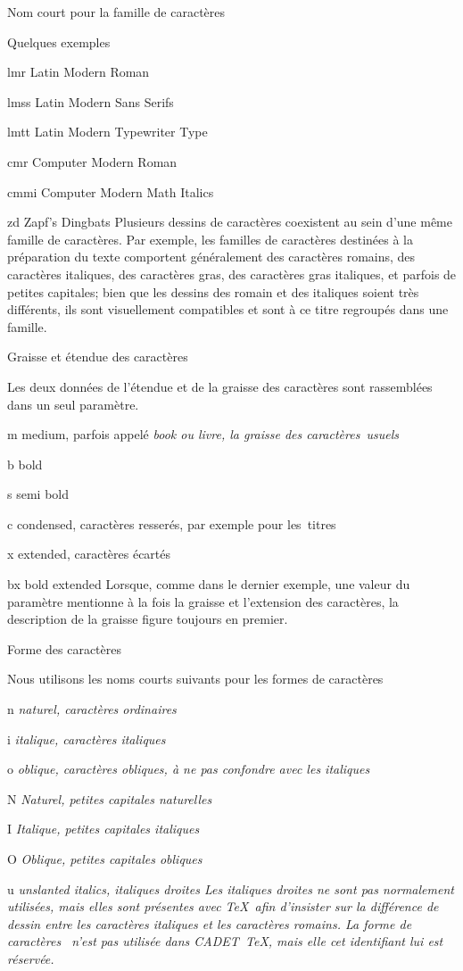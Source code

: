\formalpar Nom court pour la famille de caractères

Quelques exemples
\beginlist\tag
\item{lmr}	Latin Modern Roman
\item{lmss}	Latin Modern Sans Serifs
\item{lmtt}	Latin Modern Typewriter Type
\item{cmr}	Computer Modern Roman
\item{cmmi}	Computer Modern Math Italics
\item{zd}	Zapf's Dingbats
\endlist
Plusieurs dessins de caractères coexistent au sein d'une même famille
de caractères. Par exemple, les familles de caractères destinées à la
préparation du texte comportent généralement des caractères romains,
des caractères italiques, des caractères gras, des caractères gras
italiques, et parfois de petites capitales; bien que les dessins des
romain et des italiques soient très différents, ils sont visuellement
compatibles et sont à ce titre regroupés dans une famille.

\formalpar Graisse et étendue des caractères

Les deux données de l'étendue et de la graisse des caractères sont
rassemblées dans un seul paramètre.
\beginlist\tag
\item{m}	medium, parfois appelé \em{book} ou livre, la graisse
		des caractères~usuels
\item{b}	bold
\item{s}	semi bold
\smallskip
\item{c}	condensed, caractères resserés, par exemple pour les~titres
\item{x}	extended, caractères écartés
\smallskip
\item{bx}	bold extended
\endlist
Lorsque, comme dans le dernier exemple, une valeur du paramètre
mentionne à la fois la graisse et l'extension des caractères, la
description de la graisse figure toujours en premier.

\formalpar Forme des caractères

Nous utilisons les noms courts suivants pour les formes de caractères
\beginlist\tag
\item{n}	\em{naturel}, caractères ordinaires
\item{i}	\em{italique}, caractères italiques
\item{o}	\em{oblique}, caractères obliques,
		à ne pas confondre avec les italiques
\item{N}	\em{Naturel}, petites capitales naturelles
\item{I}	\em{Italique}, petites capitales italiques
\item{O}	\em{Oblique}, petites capitales obliques
\smallskip
\item{u}	\em{unslanted italics}, italiques droites
\endlist
Les italiques droites ne sont pas normalement utilisées, mais elles
sont présentes avec \TeX\ afin d'insister sur la différence de dessin
entre les caractères italiques et les caractères romains. La forme de
caractères~ n'est pas utilisée dans CADET~\TeX, mais elle cet
identifiant lui est réservée.


